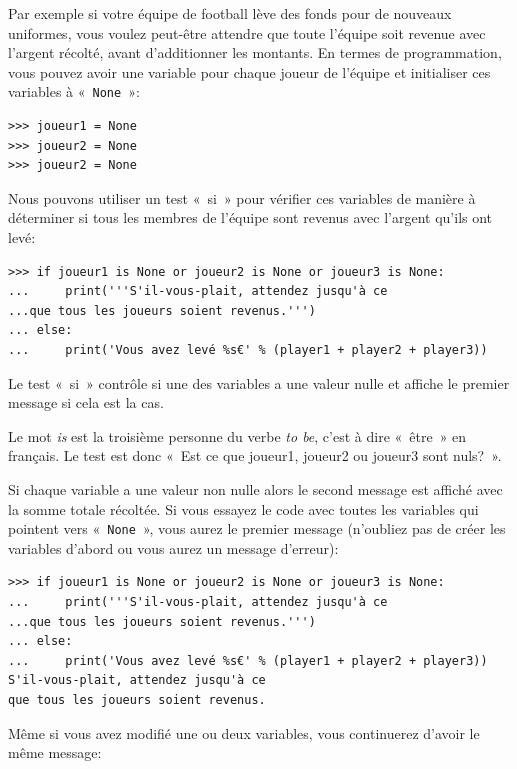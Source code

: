 Par exemple si votre équipe de football lève des fonds pour de nouveaux uniformes, vous voulez peut-être attendre que toute l'équipe soit revenue avec l'argent récolté, avant d'ad\-di\-tion\-ner les montants. En termes de programmation, vous pouvez avoir une variable pour chaque joueur de l'équipe et initialiser ces variables à «~\texttt{None}~»:

\begin{Verbatim}[frame=single,rulecolor=\color{mbleu}, label=à taper]
>>> joueur1 = None
>>> joueur2 = None
>>> joueur2 = None
\end{Verbatim}

Nous pouvons utiliser un test «~si~» pour vérifier ces variables de manière à déterminer si tous les membres de l'équipe sont revenus avec l'argent qu'ils ont levé:

\begin{Verbatim}[frame=single,rulecolor=\color{green}, label=à taper avec attention]
>>> if joueur1 is None or joueur2 is None or joueur3 is None:
...     print('''S'il-vous-plait, attendez jusqu'à ce 
...que tous les joueurs soient revenus.''')
... else:
...     print('Vous avez levé %s€' % (player1 + player2 + player3))
\end{Verbatim}

Le test «~si~» contrôle si une des variables a une valeur nulle et affiche le premier message si cela est la cas.

Le mot \emph{is} est la troisième personne du verbe \emph{to be}, c'est à dire «~être~» en français. Le test est donc «~Est ce que joueur1, joueur2 ou joueur3 sont nuls?~». 

Si chaque variable a une valeur non nulle alors le second message est affiché avec la somme totale récoltée.
Si vous essayez le code avec toutes les variables qui pointent vers «~\texttt{None}~»,  vous aurez le premier message (n'oubliez pas de créer les variables d'abord ou vous aurez un message d'erreur):

\begin{Verbatim}[frame=single,rulecolor=\color{green}, label=à taper avec attention]
>>> if joueur1 is None or joueur2 is None or joueur3 is None:
...     print('''S'il-vous-plait, attendez jusqu'à ce 
...que tous les joueurs soient revenus.''')
... else:
...     print('Vous avez levé %s€' % (player1 + player2 + player3))
S'il-vous-plait, attendez jusqu'à ce 
que tous les joueurs soient revenus.
\end{Verbatim}

Même si vous avez modifié une ou deux variables, vous continuerez d'avoir le même message:

